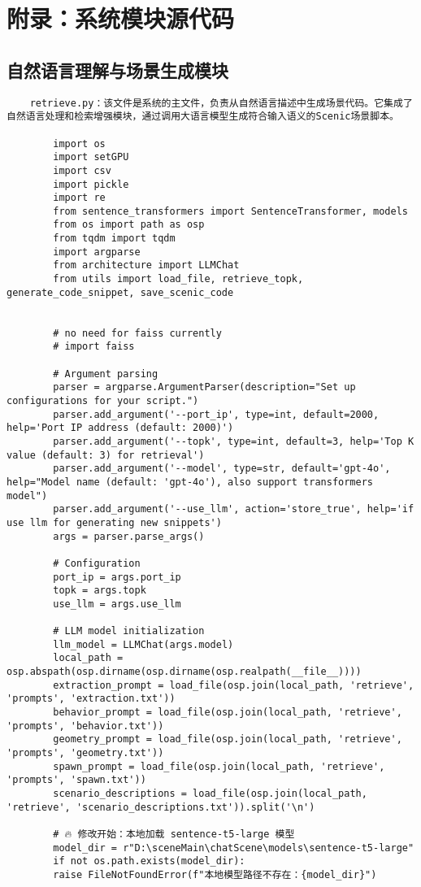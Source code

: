 \chapter{附录：系统模块源代码}

\section*{自然语言理解与场景生成模块}
\begin{lstlisting}
	retrieve.py：该文件是系统的主文件，负责从自然语言描述中生成场景代码。它集成了自然语言处理和检索增强模块，通过调用大语言模型生成符合输入语义的Scenic场景脚本。

		import os
		import setGPU
		import csv
		import pickle
		import re
		from sentence_transformers import SentenceTransformer, models
		from os import path as osp
		from tqdm import tqdm
		import argparse
		from architecture import LLMChat
		from utils import load_file, retrieve_topk, generate_code_snippet, save_scenic_code
		
		
		# no need for faiss currently
		# import faiss
		
		# Argument parsing
		parser = argparse.ArgumentParser(description="Set up configurations for your script.")
		parser.add_argument('--port_ip', type=int, default=2000, help='Port IP address (default: 2000)')
		parser.add_argument('--topk', type=int, default=3, help='Top K value (default: 3) for retrieval')
		parser.add_argument('--model', type=str, default='gpt-4o', help="Model name (default: 'gpt-4o'), also support transformers model")
		parser.add_argument('--use_llm', action='store_true', help='if use llm for generating new snippets')
		args = parser.parse_args()
		
		# Configuration
		port_ip = args.port_ip
		topk = args.topk
		use_llm = args.use_llm
		
		# LLM model initialization
		llm_model = LLMChat(args.model)
		local_path = osp.abspath(osp.dirname(osp.dirname(osp.realpath(__file__))))
		extraction_prompt = load_file(osp.join(local_path, 'retrieve', 'prompts', 'extraction.txt'))
		behavior_prompt = load_file(osp.join(local_path, 'retrieve', 'prompts', 'behavior.txt'))
		geometry_prompt = load_file(osp.join(local_path, 'retrieve', 'prompts', 'geometry.txt'))
		spawn_prompt = load_file(osp.join(local_path, 'retrieve', 'prompts', 'spawn.txt'))
		scenario_descriptions = load_file(osp.join(local_path, 'retrieve', 'scenario_descriptions.txt')).split('\n')
		
		# 🔥 修改开始：本地加载 sentence-t5-large 模型
		model_dir = r"D:\sceneMain\chatScene\models\sentence-t5-large"
		if not os.path.exists(model_dir):
		raise FileNotFoundError(f"本地模型路径不存在：{model_dir}")
		

\end{lstlisting}
